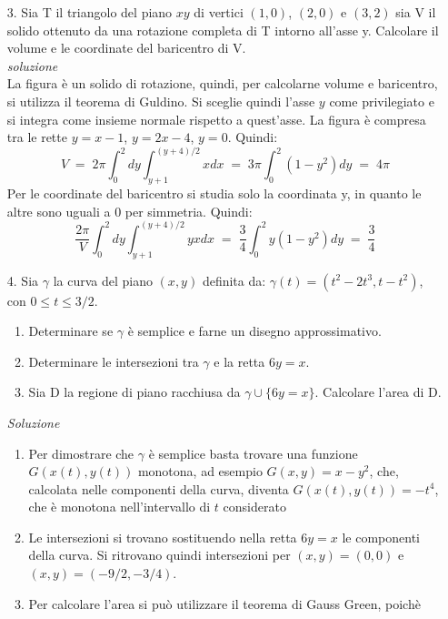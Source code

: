 \documentclass[a4paper]{article}
\begin{document}
\begin{itemize}
\item[3.] Sia T il triangolo del piano $xy$ di vertici $(1, 0)$, $(2, 0)$ e $(3, 2)$ sia V il solido
ottenuto da una rotazione completa di T intorno all’asse y. Calcolare il volume e
le coordinate del baricentro di V.\\
\emph{soluzione}\\
La figura è un solido di rotazione, quindi, per calcolarne volume e baricentro, si utilizza il teorema di Guldino. Si sceglie quindi l'asse $y$ come privilegiato e si integra come insieme normale rispetto a quest'asse. La figura è compresa tra le rette $y=x-1$, $y=2x-4$, $y=0$. Quindi:
\begin{equation}
V \; = \; 2\pi\int_{0}^{2}dy\int_{y+1}^{(y+4)/2}xdx \; = \; 3\pi\int_{0}^{2}(1-y^2)dy\; = \; 4\pi
\end{equation}
Per le coordinate del baricentro si studia solo la coordinata y, in quanto le altre sono uguali a 0 per simmetria. Quindi:
\begin{equation}
\frac{2\pi}{V}\int_{0}^{2}dy\int_{y+1}^{(y+4)/2}yxdx \; = \; \frac{3}{4}\int_{0}^{2}y(1-y^2)dy\; = \; \frac{3}{4}
\end{equation}
\item[4.] Sia $\gamma$ la curva del piano $(x, y)$ definita da: $\gamma(t) = (t^{2} - 2t^{3},t-t^{2} )$, con $0 \leq t \leq 3/2$.
\begin{enumerate}[label=(\alph*)]
\item Determinare se $\gamma$ è semplice e farne un disegno approssimativo.
\item Determinare le intersezioni tra $\gamma$ e la retta $6y = x$.
\item Sia D la regione di piano racchiusa da $\gamma \cup \{6y = x\}$. Calcolare l’area di D.
\end{enumerate}
\emph{Soluzione}\\
\begin{enumerate}[label=(\alph*)]
\item Per dimostrare che $\gamma$ è semplice basta trovare una funzione $G(x(t),y(t))$ monotona, ad esempio $G(x,y)=x-y^2$, che, calcolata nelle componenti della curva, diventa $G(x(t),y(t))=-t^4$, che è monotona nell'intervallo di $t$ considerato
\item Le intersezioni si trovano sostituendo nella retta $6y=x$ le componenti della curva. Si ritrovano quindi intersezioni per $(x,y)=(0,0)$ e $(x,y)=(-9/2,-3/4)$.
\item Per calcolare l'area si può utilizzare il teorema di Gauss Green, poichè

\end{enumerate}
\end{itemize}
\end{document}
